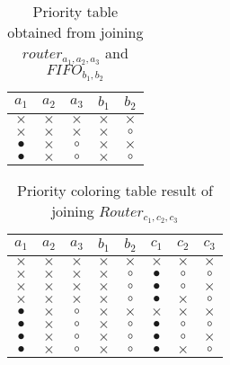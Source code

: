 \begin{BehExample}
\begin{table}
\begin{tabular}{|c|c|c|c|c|}
  \hline
$a_1$ & $a_2$ & $a_3$ & $b_1$ & $b_2$ \\ 
\hline
$\times$ & $\times$ & $\times$ & $\times$ & $\times$ \\ 
\hline
$\times$ & $\times$ & $\times$ & $\times$ & $\circ$ \\ 
\hline
$\bullet$ & $\times$ & $\circ$ & $\times$ & $\times$ \\ 
\hline
$\bullet$ & $\times$ & $\circ$ & $\times$ & $\circ$ \\ 
\hline
\end{tabular}
\caption{Priority table obtained from joining $router_{a_1, a_2, a_3}$ and $FIFO_{b_1, b_2}$}
\label{tab:j2}
\end{table}

\begin{table}
\begin{tabular}{|c|c|c|c|c|c|c|c|}
  \hline
 $a_1$ & $a_2$ & $a_3$ & $b_1$ & $b_2$ & $c_1$ & $c_2$ & $c_3$ \\ 
 \hline
 $\times$ & $\times$ & $\times$ & $\times$ & $\times$ & $\times$ & $\times$ & $\times$ \\ 
 \hline
 $\times$ & $\times$ & $\times$ & $\times$ & $\circ$ & $\bullet$ & $\circ$ & $\circ$ \\ 
 \hline
 $\times$ & $\times$ & $\times$ & $\times$ & $\circ$ & $\bullet$ & $\circ$ & $\times$ \\ 
 \hline
 $\times$ & $\times$ & $\times$ & $\times$ & $\circ$ & $\bullet$ & $\times$ & $\circ$ \\ 
 \hline
 $\bullet$ & $\times$ & $\circ$ & $\times$ & $\times$ & $\times$ & $\times$ & $\times$ \\ 
 \hline
 $\bullet$ & $\times$ & $\circ$ & $\times$ & $\circ$ & $\bullet$ & $\circ$ & $\circ$ \\ 
 \hline
 $\bullet$ & $\times$ & $\circ$ & $\times$ & $\circ$ & $\bullet$ & $\circ$ & $\times$ \\ 
 \hline
 $\bullet$ & $\times$ & $\circ$ & $\times$ & $\circ$ & $\bullet$ & $\times$ & $\circ$ \\ 
 \hline
\end{tabular}
\caption{Priority coloring table result of joining $Router_{c_1, c_2, c_3}$}
\label{tab:j4}
\end{table}


\end{BehExample}
